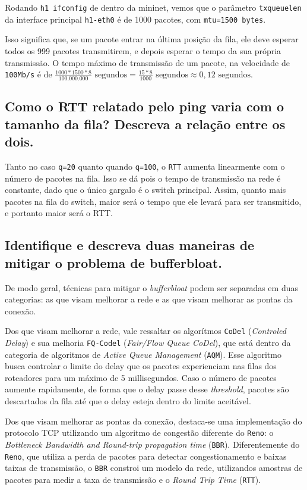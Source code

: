 \documentclass[a4paper,12pt]{article}
\newcommand{\code}[1]{\texttt{#1}}
\begin{document}
Rodando \code{h1 ifconfig} de dentro da mininet, vemos que o parâmetro \code{txqueuelen} da interface principal \code{h1-eth0} é de 1000 pacotes, com \code{mtu=1500 bytes}.

Isso significa que, se um pacote entrar na última posição da fila, ele deve esperar todos os 999 pacotes transmitirem, e depois esperar o tempo da sua própria transmissão. O tempo máximo de transmissão de um pacote, na velocidade de \code{100Mb/s} é de $\frac{1000 * 1500 * 8}{100.000.000} \text{ segundos} = \frac{15 * 8}{1000} \text{ segundos} \approx 0,12 \text{ segundos} $. 

\subsection{Como o RTT relatado pelo ping varia com o tamanho da fila? Descreva a relação entre os dois.}

Tanto no caso \code{q=20} quanto quando \code{q=100}, o \code{RTT} aumenta linearmente com o número de pacotes na fila. Isso se dá pois o tempo de transmissão na rede é constante, dado que o único gargalo é o switch principal. Assim, quanto mais pacotes na fila do switch, maior será o tempo que ele levará para ser transmitido, e portanto maior será o RTT.

\subsection{Identifique e descreva duas maneiras de mitigar o problema de bufferbloat.}

De modo geral, técnicas para mitigar o \textit{bufferbloat} podem ser separadas em duas categorias: as que visam melhorar a rede e as que visam melhorar as pontas da conexão.

Dos que visam melhorar a rede, vale ressaltar os algorítmos \code{CoDel} (\textit{Controled Delay}) e sua melhoria \code{FQ-Codel} (\textit{Fair/Flow Queue CoDel}), que está dentro da categoria de algoritmos de \textit{Active Queue Management} (\code{AQM}). Esse algoritmo busca controlar o limite do delay que os pacotes experienciam nas filas dos roteadores para um máximo de 5 millisegundos. Caso o número de pacotes aumente rapidamente, de forma que o delay passe desse \textit{threshold}, pacotes são descartados da fila até que o delay esteja dentro do limite aceitável.

Dos que visam melhorar as pontas da conexão, destaca-se uma implementação do protocolo TCP utilizando um algoritmo de congestão diferente do \code{Reno}: o \textit{Bottleneck Bandwidth and Round-trip propagation time} (\code{BBR}). Diferentemente do \code{Reno}, que utiliza a perda de pacotes para detectar congestionamento e baixas taixas de transmissão, o \code{BBR} constroi um modelo da rede, utilizandos amostras de pacotes para medir a taxa de transmissão e o \textit{Round Trip Time} (\code{RTT}).

\end{document}
